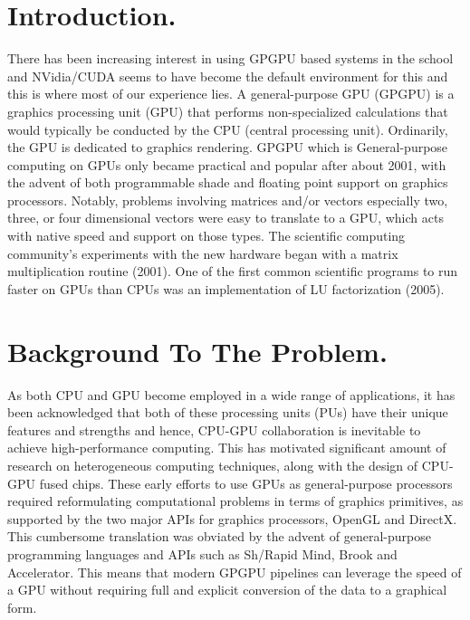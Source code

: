\documentclass{article}
\begin{document}
\begin{large}\textbf{}\end{large}

\section{Introduction.}
{There has been increasing interest in using GPGPU based systems in the school and NVidia/CUDA
seems to have become the default environment for this and this is where most of our experience lies.
A general-purpose GPU (GPGPU) is a graphics processing unit (GPU) that performs non-specialized
calculations that would typically be conducted by the CPU (central processing unit). Ordinarily, the
GPU is dedicated to graphics rendering. GPGPU which is General-purpose computing on GPUs only
became practical and popular after about 2001, with the advent of both programmable shade and
floating point support on graphics processors. Notably, problems involving matrices and/or vectors
especially two, three, or four dimensional vectors were easy to translate to a GPU, which acts with
native speed and support on those types. The scientific computing community’s experiments with
the new hardware began with a matrix multiplication routine (2001). One of the first common
scientific programs to run faster on GPUs than CPUs was an implementation of LU factorization
(2005).
}

\section{Background To The Problem.}
{As both CPU and GPU become employed in a wide range of applications, it has been acknowledged
that both of these processing units (PUs) have their unique features and strengths and hence,
CPU-GPU collaboration is inevitable to achieve high-performance computing. This has motivated
significant amount of research on heterogeneous computing techniques, along with the design of
CPU-GPU fused chips. These early efforts to use GPUs as general-purpose processors required
reformulating computational problems in terms of graphics primitives, as supported by the two major
APIs for graphics processors, OpenGL and DirectX. This cumbersome translation was obviated by
the advent of general-purpose programming languages and APIs such as Sh/Rapid Mind, Brook and
Accelerator. This means that modern GPGPU pipelines can leverage the speed of a GPU without
requiring full and explicit conversion of the data to a graphical form.
}
\end{document}

